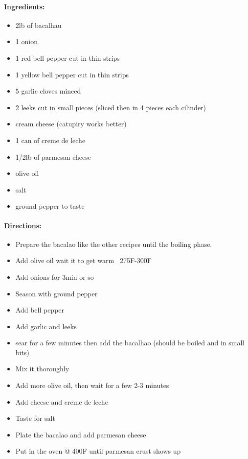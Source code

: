 \documentclass{article}
\begin{document}
\paragraph{Ingredients:}

\begin{itemize}
	\item 2lb of bacalhau
	\item 1 onion
	\item 1 red bell pepper cut in thin strips
	\item 1 yellow bell pepper cut in thin strips
	\item 5 garlic cloves minced
	\item 2 leeks cut in small pieces (sliced then in 4 pieces each cilinder)
	\item cream cheese (catupiry works better)
	\item 1 can of creme de leche
	\item 1/2lb of parmesan cheese
	\item olive oil
	\item salt
	\item ground pepper to taste
\end{itemize}

\paragraph{Directions:}
\begin{itemize}
	\item Prepare the bacalao like the other recipes until the boiling phase.
	\item Add olive oil wait it to get warm ~275F-300F
	\item Add onions for 3min or so
	\item Season with ground pepper
	\item Add bell pepper
	\item Add garlic and leeks
	\item sear for a few minutes then add the bacalhao (should be boiled and in small bits)
	\item Mix it thoroughly
	\item Add more olive oil, then wait for a few 2-3 minutes
	\item Add cheese and creme de leche
	\item Taste for salt
	\item Plate the bacalao and add parmesan cheese
	\item Put in the oven @ 400F until parmesan crust shows up
\end{itemize}
\end{document}
